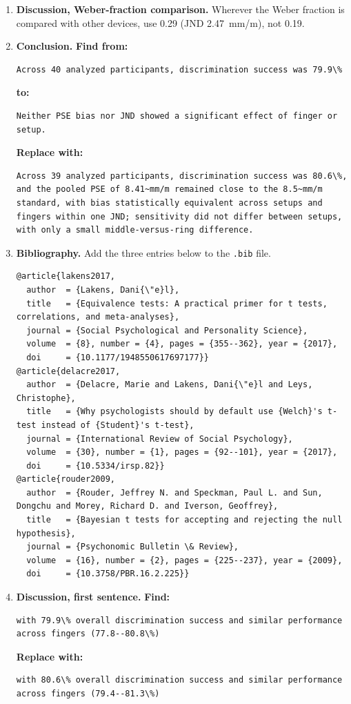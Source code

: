 \documentclass[11pt,a4paper]{article}
\newcommand{\replace}{\noindent\textbf{Replace with:}\par\nopagebreak}
\begin{document}
\begin{enumerate}[resume]
\item \textbf{Discussion, Weber-fraction comparison.} Wherever the Weber fraction is compared with other devices, use 0.29 (JND 2.47~mm/m), not 0.19.

\item \textbf{Conclusion.}
\noindent\textbf{Find from:}\begin{lstlisting}
Across 40 analyzed participants, discrimination success was 79.9\%
\end{lstlisting}
\noindent\textbf{to:}\begin{lstlisting}
Neither PSE bias nor JND showed a significant effect of finger or setup.
\end{lstlisting}
\replace
\begin{lstlisting}
Across 39 analyzed participants, discrimination success was 80.6\%, and the pooled PSE of 8.41~mm/m remained close to the 8.5~mm/m standard, with bias statistically equivalent across setups and fingers within one JND; sensitivity did not differ between setups, with only a small middle-versus-ring difference.
\end{lstlisting}

\item \textbf{Bibliography.} Add the three entries below to the \texttt{.bib} file.
\begin{lstlisting}
@article{lakens2017,
  author  = {Lakens, Dani{\"e}l},
  title   = {Equivalence tests: A practical primer for t tests, correlations, and meta-analyses},
  journal = {Social Psychological and Personality Science},
  volume  = {8}, number = {4}, pages = {355--362}, year = {2017},
  doi     = {10.1177/1948550617697177}}
@article{delacre2017,
  author  = {Delacre, Marie and Lakens, Dani{\"e}l and Leys, Christophe},
  title   = {Why psychologists should by default use {Welch}'s t-test instead of {Student}'s t-test},
  journal = {International Review of Social Psychology},
  volume  = {30}, number = {1}, pages = {92--101}, year = {2017},
  doi     = {10.5334/irsp.82}}
@article{rouder2009,
  author  = {Rouder, Jeffrey N. and Speckman, Paul L. and Sun, Dongchu and Morey, Richard D. and Iverson, Geoffrey},
  title   = {Bayesian t tests for accepting and rejecting the null hypothesis},
  journal = {Psychonomic Bulletin \& Review},
  volume  = {16}, number = {2}, pages = {225--237}, year = {2009},
  doi     = {10.3758/PBR.16.2.225}}
\end{lstlisting}

\item \textbf{Discussion, first sentence.}
\noindent\textbf{Find:}\begin{lstlisting}
with 79.9\% overall discrimination success and similar performance across fingers (77.8--80.8\%)
\end{lstlisting}
\replace
\begin{lstlisting}
with 80.6\% overall discrimination success and similar performance across fingers (79.4--81.3\%)
\end{lstlisting}


\end{enumerate}
\end{document}
